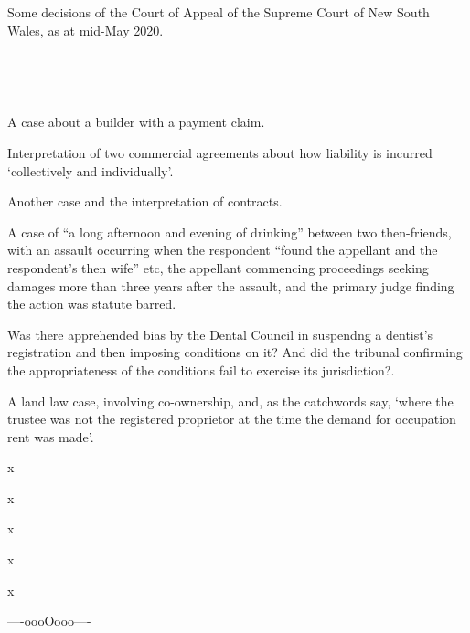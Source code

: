 \newcommand\theball{\tikz \shade[ball color=green!40] (0,0) circle (0.75ex);\hspace{0.75em}}




\noindent Some decisions of the Court of Appeal of the Supreme Court of New South Wales, as at mid-May 2020.
\bigskip

\hfill{}\hfill\ %
\bigskip

\printlawciteindexes
\bigskip
\hfill{}\hfill\ %
\bigskip


\newpage

\bigskip

\setnumparshiftleft{\hspace{-2em}\theball\hspace{1.5em}}
\setnumparfillright{\hspace{0.5em}---\hspace{0.5em}}
\setnumpardelimpost{}

\p A case about a builder with a  payment claim.

\p Interpretation of two commercial agreements about how liability is incurred `collectively and individually'.

\p Another  case and the interpretation of contracts.

\p A case of ``a long afternoon and evening of drinking'' between two then-friends, with an assault occurring when the respondent ``found the appellant and the respondent’s then wife'' etc, the appellant commencing proceedings seeking damages more than three years after the assault, and the primary judge finding the action was statute barred.

\p Was there apprehended bias by the Dental Council in suspendng a dentist's registration and then imposing conditions on it? And did the tribunal confirming the appropriateness of the conditions fail to exercise its jurisdiction?.

\p A land law case, involving co-ownership, and, as the catchwords say, `where the trustee was not the registered proprietor at the time the demand for occupation rent was made'.

\p x

\p x

\p x

\p x

\p x

\bigskip
\bigskip
\hfill ----oooOooo---- \hfill\ 
